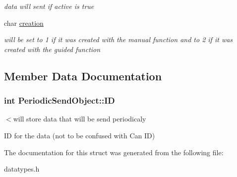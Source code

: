 \begin{DoxyCompactItemize}
\begin{DoxyCompactList}\small\item\em data will sent if active is true \end{DoxyCompactList}\item 
\hypertarget{struct_periodic_send_object_a82892f94c820ac75f78cd60a5f292ee3}{}char \hyperlink{struct_periodic_send_object_a82892f94c820ac75f78cd60a5f292ee3}{creation}\label{struct_periodic_send_object_a82892f94c820ac75f78cd60a5f292ee3}

\begin{DoxyCompactList}\small\item\em will be set to 1 if it was created with the manual function and to 2 if it was created with the guided function \end{DoxyCompactList}\end{DoxyCompactItemize}


\subsection{Member Data Documentation}
\hypertarget{struct_periodic_send_object_a45e7f57f2eb1c2dac99db98aeb9d87a1}{}
\subsubsection[{I\+D}]{\setlength{\rightskip}{0pt plus 5cm}int Periodic\+Send\+Object\+::\+I\+D}\label{struct_periodic_send_object_a45e7f57f2eb1c2dac99db98aeb9d87a1}


$<$will store data that will be send periodicaly 

I\+D for the data (not to be confused with Can I\+D) 

The documentation for this struct was generated from the following file\+:\begin{DoxyCompactItemize}
\item 
datatypes.\+h\end{DoxyCompactItemize}
